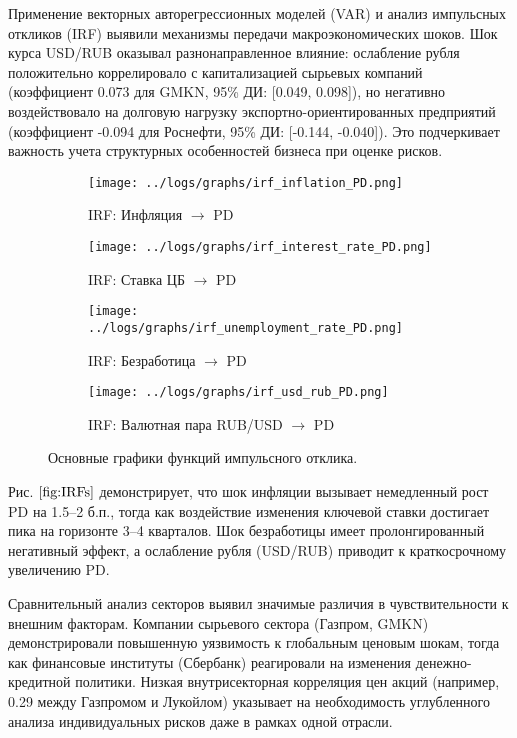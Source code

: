 \documentclass[]{article}
\begin{document}
	
	Применение векторных авторегрессионных моделей (VAR) и анализ импульсных откликов (IRF) выявили механизмы передачи макроэкономических шоков. Шок курса USD/RUB оказывал разнонаправленное влияние: ослабление рубля положительно коррелировало с капитализацией сырьевых компаний (коэффициент 0.073 для GMKN, 95\% ДИ: [0.049, 0.098]), но негативно воздействовало на долговую нагрузку экспортно-ориентированных предприятий (коэффициент -0.094 для Роснефти, 95\% ДИ: [-0.144, -0.040]). Это подчеркивает важность учета структурных особенностей бизнеса при оценке рисков.
	
\begin{figure}[ht]
	\centering
	\begin{subfigure}[b]{0.48\textwidth} %
		\texttt{[image: ../logs/graphs/irf\_inflation\_PD.png]}
		\caption{IRF: Инфляция $\rightarrow$ PD}
		\label{fig:img1}
	\end{subfigure}
	\hfill %
	\begin{subfigure}[b]{0.48\textwidth}
		\texttt{[image: ../logs/graphs/irf\_interest\_rate\_PD.png]}
		\caption{IRF: Ставка ЦБ $\rightarrow$ PD}
		\label{fig:img2}
	\end{subfigure}
	
	\vspace{0.5cm} %
	
	\begin{subfigure}[b]{0.48\textwidth}
		\texttt{[image: ../logs/graphs/irf\_unemployment\_rate\_PD.png]}
		\caption{IRF: Безработица $\rightarrow$ PD}
		\label{fig:img3}
	\end{subfigure}
	\hfill
	\begin{subfigure}[b]{0.48\textwidth}
		\texttt{[image: ../logs/graphs/irf\_usd\_rub\_PD.png]}
		\caption{IRF: Валютная пара RUB/USD $\rightarrow$ PD}
		\label{fig:img4}
	\end{subfigure}
	\caption{Основные графики функций импульсного отклика.}
	\label{fig:IRFs}
\end{figure}
	
	Рис. $\ref{fig:IRFs}$ демонстрирует, что шок инфляции вызывает немедленный рост PD на 1.5–2 б.п., тогда как воздействие изменения ключевой ставки достигает пика на горизонте 3–4 кварталов. Шок безработицы имеет пролонгированный негативный эффект, а ослабление рубля (USD/RUB) приводит к краткосрочному увеличению PD.  
	
	Сравнительный анализ секторов выявил значимые различия в чувствительности к внешним факторам. Компании сырьевого сектора (Газпром, GMKN) демонстрировали повышенную уязвимость к глобальным ценовым шокам, тогда как финансовые институты (Сбербанк) реагировали на изменения денежно-кредитной политики. Низкая внутрисекторная корреляция цен акций (например, 0.29 между Газпромом и Лукойлом) указывает на необходимость углубленного анализа индивидуальных рисков даже в рамках одной отрасли.
	
\end{document}
